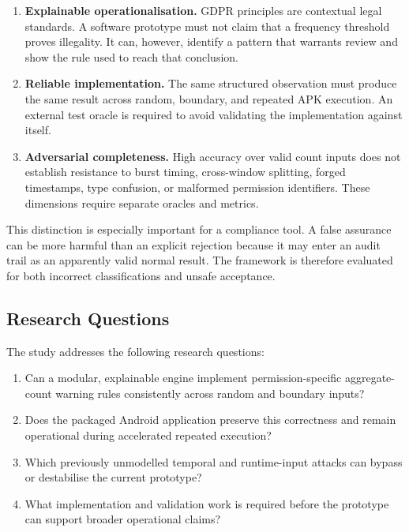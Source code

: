 \begin{enumerate}
    \item \textbf{Explainable operationalisation.} GDPR principles are contextual legal standards. A software prototype must not claim that a frequency threshold proves illegality. It can, however, identify a pattern that warrants review and show the rule used to reach that conclusion.
    \item \textbf{Reliable implementation.} The same structured observation must produce the same result across random, boundary, and repeated APK execution. An external test oracle is required to avoid validating the implementation against itself.
    \item \textbf{Adversarial completeness.} High accuracy over valid count inputs does not establish resistance to burst timing, cross-window splitting, forged timestamps, type confusion, or malformed permission identifiers. These dimensions require separate oracles and metrics.
\end{enumerate}

This distinction is especially important for a compliance tool. A false assurance can be more harmful than an explicit rejection because it may enter an audit trail as an apparently valid normal result. The framework is therefore evaluated for both incorrect classifications and unsafe acceptance.

\subsection{Research Questions}

The study addresses the following research questions:

\begin{enumerate}
    \item Can a modular, explainable engine implement permission-specific aggregate-count warning rules consistently across random and boundary inputs?
    \item Does the packaged Android application preserve this correctness and remain operational during accelerated repeated execution?
    \item Which previously unmodelled temporal and runtime-input attacks can bypass or destabilise the current prototype?
    \item What implementation and validation work is required before the prototype can support broader operational claims?
\end{enumerate}

